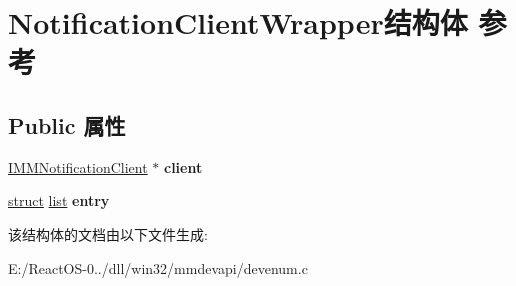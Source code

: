 \hypertarget{struct_notification_client_wrapper}{}\section{Notification\+Client\+Wrapper结构体 参考}
\label{struct_notification_client_wrapper}
\subsection*{Public 属性}
\begin{DoxyCompactItemize}
\item 
\mbox{\label{struct_notification_client_wrapper_aea461585c72cd008bc83a26042eee6b9}} 
\hyperlink{interface_i_m_m_notification_client}{I\+M\+M\+Notification\+Client} $\ast$ {\bfseries client}
\item 
\mbox{\label{struct_notification_client_wrapper_ab18cded0a270bd283b34080aa75a62fd}} 
\hyperlink{interfacestruct}{struct} \hyperlink{classlist}{list} {\bfseries entry}
\end{DoxyCompactItemize}


该结构体的文档由以下文件生成\+:\begin{DoxyCompactItemize}
\item 
E\+:/\+React\+O\+S-\/0../dll/win32/mmdevapi/devenum.\+c\end{DoxyCompactItemize}
